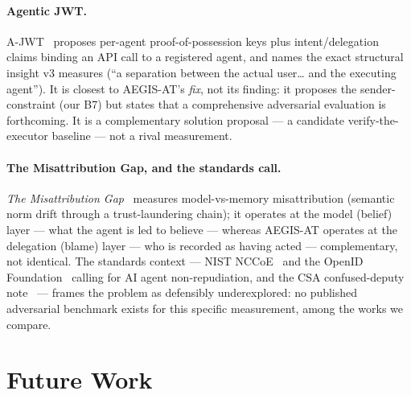 \documentclass[11pt]{article}
\begin{document}
\paragraph{Agentic JWT.}
A-JWT~\cite{agenticjwt} proposes per-agent proof-of-possession keys plus
intent/delegation claims binding an API call to a registered agent, and names the
exact structural insight v3 measures (``a separation between the actual user\ldots
and the executing agent''). It is closest to AEGIS-AT's \emph{fix}, not its
finding: it proposes the sender-constraint (our B7) but states that a
comprehensive adversarial evaluation is forthcoming. It is a complementary
solution proposal --- a candidate verify-the-executor baseline --- not a rival
measurement.

\paragraph{The Misattribution Gap, and the standards call.}
\emph{The Misattribution Gap}~\cite{misattribution} measures
model-vs-memory misattribution (semantic norm drift through a trust-laundering
chain); it operates at the model (belief) layer --- what the agent is led to
believe --- whereas AEGIS-AT operates at the delegation (blame) layer --- who is
recorded as having acted --- complementary, not identical. The standards context --- NIST
NCCoE~\cite{nist2026} and the OpenID Foundation~\cite{openid2026} calling for AI
agent non-repudiation, and the CSA confused-deputy note~\cite{csa2026} --- frames
the problem as defensibly underexplored: no published adversarial benchmark exists
for this specific measurement, among the works we compare.

\section{Future Work}
\label{sec:future}
\end{document}
